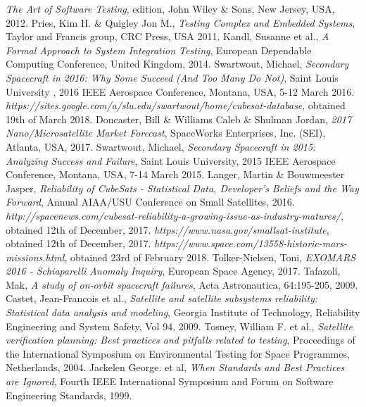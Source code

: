 \documentclass[english,12pt,a4paper,pdftex,elec,utf8]{aaltothesis}
\begin{document}
\begin{thebibliography}{99}
  \textit{The Art of Software Testing},  edition, John Wiley \& Sons, New Jersey, USA, 2012.
 Pries, Kim H. \& Quigley Jon M.,
  \textit{Testing Complex and Embedded Systems}, Taylor and Francis group, CRC Press, USA 2011.
 Kandl, Susanne et al.,
  \textit{A Formal Approach to System Integration Testing}, European Dependable Computing Conference, United Kingdom, 2014.  
 Swartwout, Michael,
  \textit{Secondary Spacecraft in 2016: Why Some Succeed (And Too Many Do Not)}, Saint Louis University , 2016 IEEE Aerospace Conference, Montana, USA,  5-12 March 2016.
  \textit{https://sites.google.com/a/slu.edu/swartwout/home/cubesat-database}, obtained 19th of March 2018. 
 Doncaster, Bill \& Williams Caleb \& Shulman Jordan,
  \textit{2017 Nano/Microsatellite Market Forecast}, SpaceWorks Enterprises, Inc. (SEI), Atlanta, USA, 2017.
 Swartwout, Michael,
  \textit{Secondary Spacecraft in 2015: Analyzing Success and Failure}, Saint Louis University, 2015 IEEE Aerospace Conference, Montana, USA, 7-14 March 2015. 
 Langer, Martin \& Bouwmeester Jasper,
  \textit{Reliability of CubeSats - Statistical Data, Developer's Beliefs and the Way Forward},  Annual AIAA/USU Conference on Small Satellites, 2016.
  \textit{http://spacenews.com/cubesat-reliability-a-growing-issue-as-industry-matures/}, obtained 12th of December, 2017.  
  \textit{https://www.nasa.gov/smallsat-institute}, obtained 12th of December, 2017. 
  \textit{https://www.space.com/13558-historic-mars-missions.html}, obtained 23rd of February 2018.
 Tolker-Nielsen, Toni,
  \textit{EXOMARS 2016 - Schiaparelli Anomaly Inquiry}, European Space Agency, 2017.
 Tafazoli, Mak,
  \textit{A study of on-orbit spacecraft failures}, Acta Astronautica, 64:195-205, 2009.
 Castet, Jean-Francois et al.,
  \textit{Satellite and satellite subsystems reliability: Statistical data analysis
and modeling}, Georgia Institute of Technology, Reliability Engineering and System Safety, Vol 94, 2009.
 Tosney, William F. et al.,
  \textit{Satellite verification planning: Best practices and pitfalls related to testing}, Proceedings of the  International Symposium on Environmental Testing for Space Programmes, Netherlands, 2004.
 Jackelen George. et al,
  \textit{When Standards and Best Practices are Ignored}, Fourth IEEE International Symposium and Forum on Software Engineering Standards, 1999.

\end{thebibliography}
\end{document}
